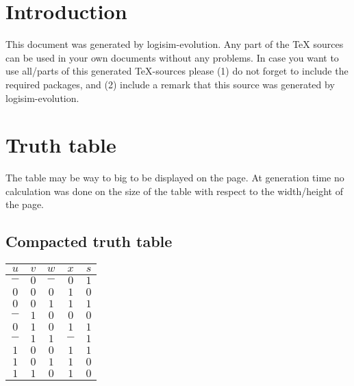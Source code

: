 \documentclass [15pt,a4paper,twoside]{article}
\begin{document}
\section{Introduction}
This document was generated by logisim-evolution. Any part of the TeX sources can be used in your own documents without any problems. In case you want to use all/parts of this generated TeX-sources please (1) do not forget to include the required packages, and (2) include a remark that this source was generated by logisim-evolution.
\section{Truth table}
The table may be way to big to be displayed on the page. At generation time no calculation was done on the size of the table with respect to the width/height of the page.
\subsection{Compacted truth table}
\begin{center}
\begin{tabular}{cccc|c}
$u$&$v$&$w$&$x$&$s$\\
\hline
$-$&$0$&$-$&$0$&$1$\\
$0$&$0$&$0$&$1$&$0$\\
$0$&$0$&$1$&$1$&$1$\\
$-$&$1$&$0$&$0$&$0$\\
$0$&$1$&$0$&$1$&$1$\\
$-$&$1$&$1$&$-$&$1$\\
$1$&$0$&$0$&$1$&$1$\\
$1$&$0$&$1$&$1$&$0$\\
$1$&$1$&$0$&$1$&$0$\\

\end{tabular}
\end{center}
\end{document}
